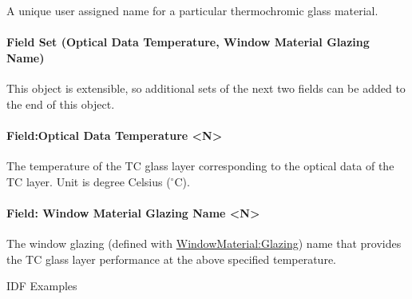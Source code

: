 A unique user assigned name for a particular thermochromic glass material.

\paragraph{Field Set (Optical Data Temperature, Window Material Glazing Name)}\label{field-set-optical-data-temperature-window-material-glazing-name-is-extensible.}

This object is extensible, so additional sets of the next two fields can be added to the end of this object.

\paragraph{Field:Optical Data Temperature \textless{}N\textgreater{}}\label{fieldoptical-data-temperature-n}

The temperature of the TC glass layer corresponding to the optical data of the TC layer. Unit is degree Celsius ($^\circ$C).

\paragraph{Field: Window Material Glazing Name \textless{}N\textgreater{}}\label{field-window-material-glazing-name-n}

The window glazing (defined with \hyperref[windowmaterialglazing]{WindowMaterial:Glazing}) name that provides the TC glass layer performance at the above specified temperature.

IDF Examples

